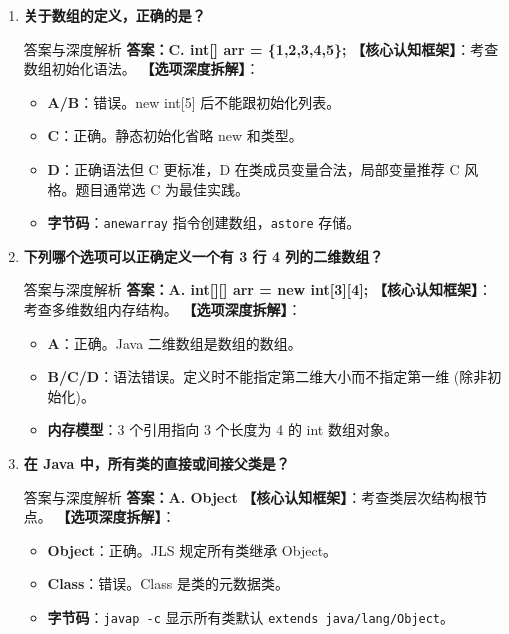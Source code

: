 \documentclass[12pt, a4paper]{ctexart}
\newcommand{\code}[1]{\texttt{\color{myblue}#1}}
\begin{document}
\begin{enumerate}[label=\arabic*.]
	\item \textbf{关于数组的定义，正确的是？}
	      \begin{bluebox}{答案与深度解析}
		      \textbf{答案：C. int[] arr = \{1,2,3,4,5\};}
		      \textbf{【核心认知框架】}：考查数组初始化语法。
		      \textbf{【选项深度拆解】}：
		      \begin{itemize}[leftmargin=*, nosep]
			      \item \textbf{A/B}：错误。new int[5] 后不能跟初始化列表。
			      \item \textbf{C}：正确。静态初始化省略 new 和类型。
			      \item \textbf{D}：正确语法但 C 更标准，D 在类成员变量合法，局部变量推荐 C 风格。题目通常选 C 为最佳实践。
			      \item \textbf{字节码}：\code{anewarray} 指令创建数组，\code{astore} 存储。
		      \end{itemize}
	      \end{bluebox}

	\item \textbf{下列哪个选项可以正确定义一个有 3 行 4 列的二维数组？}
	      \begin{bluebox}{答案与深度解析}
		      \textbf{答案：A. int[][] arr = new int[3][4];}
		      \textbf{【核心认知框架】}：考查多维数组内存结构。
		      \textbf{【选项深度拆解】}：
		      \begin{itemize}[leftmargin=*, nosep]
			      \item \textbf{A}：正确。Java 二维数组是数组的数组。
			      \item \textbf{B/C/D}：语法错误。定义时不能指定第二维大小而不指定第一维 (除非初始化)。
			      \item \textbf{内存模型}：3 个引用指向 3 个长度为 4 的 int 数组对象。
		      \end{itemize}
	      \end{bluebox}

	\item \textbf{在 Java 中，所有类的直接或间接父类是？}
	      \begin{bluebox}{答案与深度解析}
		      \textbf{答案：A. Object}
		      \textbf{【核心认知框架】}：考查类层次结构根节点。
		      \textbf{【选项深度拆解】}：
		      \begin{itemize}[leftmargin=*, nosep]
			      \item \textbf{Object}：正确。JLS 规定所有类继承 Object。
			      \item \textbf{Class}：错误。Class 是类的元数据类。
			      \item \textbf{字节码}：\code{javap -c} 显示所有类默认 \code{extends java/lang/Object}。
		      \end{itemize}
	      \end{bluebox}


\end{enumerate}
\end{document}
